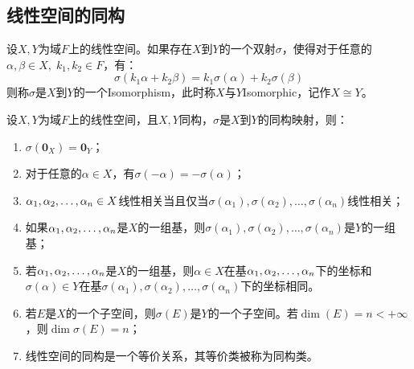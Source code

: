 \subsection{线性空间的同构}
\begin{definition}
	设$X,Y$为域$F$上的线性空间。如果存在$X$到$Y$的一个双射$\sigma$，使得对于任意的$\alpha,\beta\in X,\;k_1,k_2\in F$，有：
	\begin{equation*}
		\sigma(k_1\alpha+k_2\beta)=k_1\sigma(\alpha)+k_2\sigma(\beta)
	\end{equation*}
	则称$\sigma$是$X$到$Y$的一个\gls{Isomorphism}，此时称$X$与$Y$\gls{Isomorphic}，记作$X\cong Y$。
\end{definition}
\begin{property}\label{prop:IsomorphicOfLinearSpace}
	设$X,Y$为域$F$上的线性空间，且$X,Y$同构，$\sigma$是$X$到$Y$的同构映射，则：
	\begin{enumerate}
		\item $\sigma(\mathbf{0}_X)=\mathbf{0}_Y$；
		\item 对于任意的$\alpha\in X$，有$\sigma(-\alpha)=-\sigma(\alpha)$；
		\item $\alpha_1, \alpha_2, \dots, \alpha_{n}\in X$线性相关当且仅当$\sigma(\alpha_1),\sigma(\alpha_2),\dots,\sigma(\alpha_n)$线性相关；
		\item 如果$\alpha_1, \alpha_2, \dots, \alpha_{n}$是$X$的一组基，则$\sigma(\alpha_1),\sigma(\alpha_2),\dots,\sigma(\alpha_n)$是$Y$的一组基；
		\item 若$\alpha_1, \alpha_2, \dots, \alpha_{n}$是$X$的一组基，则$\alpha\in X$在基$\alpha_1, \alpha_2, \dots, \alpha_{n}$下的坐标和$\sigma(\alpha)\in Y$在基$\sigma(\alpha_1),\sigma(\alpha_2),\dots,\sigma(\alpha_n)$下的坐标相同。
		\item 若$E$是$X$的一个子空间，则$\sigma(E)$是$Y$的一个子空间。若$\dim(E)=n<+\infty$，则$\dim \sigma(E)=n$；
		\item 线性空间的同构是一个等价关系，其等价类被称为同构类。
	\end{enumerate}
\end{property}
